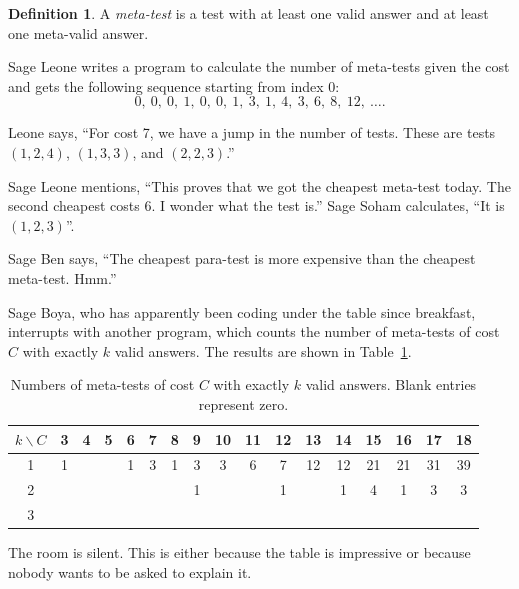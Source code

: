 \documentclass[12pt,reqno]{article}
\theoremstyle{plain}
\theoremstyle{definition}
\newtheorem{definition}{Definition}
\theoremstyle{remark}
\begin{document}
\begin{definition}
   A \textit{meta-test} is a test with at least one valid answer and at least one meta-valid answer.
\end{definition}

Sage Leone writes a program to calculate the number of meta-tests given the cost and gets the following sequence starting from index 0:
\[0,\ 0,\ 0,\ 1,\ 0,\ 0,\ 1,\ 3,\ 1,\ 4,\ 3,\ 6,\ 8,\ 12,\ \dots.\]

Leone says, ``For cost 7, we have a jump in the number of tests. These are tests $(1,2,4)$, $(1,3,3)$, and $(2,2,3)$.''

Sage Leone mentions, ``This proves that we got the cheapest meta-test today. The second cheapest costs $6$. I wonder what the test is.'' Sage Soham calculates, ``It is $(1,2,3)$''.

Sage Ben says, ``The cheapest para-test is more expensive than the cheapest meta-test. Hmm.''

Sage Boya, who has apparently been coding under the table since breakfast, interrupts with another program, which counts the number of meta-tests of cost $C$ with exactly $k$ valid answers. The results are shown in Table~\ref{tab:meta-tests-by-cost}.

\begin{table}[ht!]
\centering
\begin{tabular}{|c|c|c|c|c|c|c|c|c|c|c|c|c|c|c|c|c|}
\hline
$k\backslash C$ & 3 & 4 & 5 & 6 & 7 & 8 & 9 & 10 & 11 & 12 & 13 & 14 & 15 & 16 & 17 & 18 \\ \hline
1 & 1 & & & 1 & 3 & 1 & 3 & 3 & 6 & 7 & 12 & 12 & 21 & 21 & 31 & 39 \\ \hline
2 & & & & & & & 1 & & & 1 & & 1 & 4 & 1 & 3 & 3 \\ \hline
3 & & & & & & & & & & & & & & & & \\ \hline
\end{tabular}
\caption{Numbers of meta-tests of cost $C$ with exactly $k$ valid answers. Blank entries represent zero.}
\label{tab:meta-tests-by-cost}
\end{table}

The room is silent. This is either because the table is impressive or because nobody wants to be asked to explain it.
\end{document}

